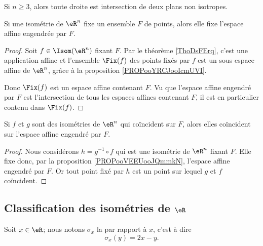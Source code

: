 \begin{lemma}
    Si \( n\geq 3\), alors toute droite est intersection de deux plans non isotropes.
\end{lemma}

\begin{proposition}      \label{PROPooVEEUooJQmmkN}
    Si une isométrie de \( \eR^n\) fixe un ensemble \( F\) de points, alors elle fixe l'espace affine engendrée par \( F\).
\end{proposition}

\begin{proof}
    Soit \( f\in \Isom(\eR^n)\) fixant \( F\). Par le théorème \ref{ThoDsFErq}, c'est une application affine et l'ensemble \( \Fix(f)\) des points fixés par \( f\) est un sous-espace affine de \( \eR^n\), grâce à la proposition \ref{PROPooYRCJooIcmUVI}.

    Donc \( \Fix(f)\) est un espace affine contenant \( F\). Vu que l'espace affine engendré par \( F\) est l'intersection de tous les espaces affines contenant \( F\), il est en particulier contenu dans \( \Fix(f)\).
\end{proof}

\begin{corollary}       \label{CORooZHZZooDgTzsW}
    Si \( f\) et \( g\) sont des isométries de \( \eR^n\) qui coïncident sur \( F\), alors elles coïncident sur l'espace affine engendré par \( F\).
\end{corollary}

\begin{proof}
    Nous considérons \( h=g^{-1}\circ f\) qui est une isométrie de \( \eR^n\) fixant \( F\). Elle fixe donc, par la proposition \ref{PROPooVEEUooJQmmkN}, l'espace affine engendré par $F$. Or tout point fixé par \( h\) est un point sur lequel \( g\) et \( f\) coïncident.
\end{proof}

\subsection{Classification des isométries de \( \eR\)}

\begin{definition}
    Soit \( x\in \eR\); nous notons \( \sigma_x\) la  par rapport à \( x\), c'est à dire
    \begin{equation}
        \sigma_x(y)=2x-y.
    \end{equation}
\end{definition}

